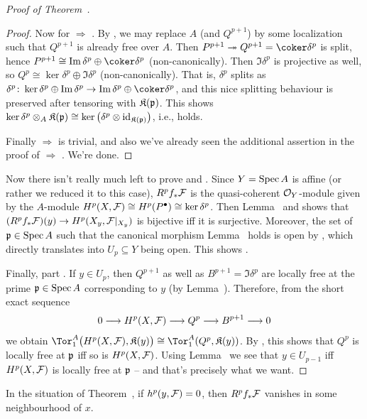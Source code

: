 \documentclass[a4paper,parskip=half,numbers=enddot, DIV=12]{scrreprt}
\begin{document}
\begin{proof}[Proof of Theorem~]
\begin{proof}
	Now for  $\Rightarrow$ . By \cite[Corollary~1.5.1]{alg2}, we may replace $A$ (and $Q^{p+1}$) by some localization such that $Q^{p+1}$ is already free over $A$. Then $P^{p+1}\epimorphism Q^{p+1}=\coker\delta^p$ is split, hence $P^{p+1}\cong \Im\delta^p\oplus \coker\delta^p$ (non-canonically). Then $\Im\delta^p$ is projective as well, so $Q^p\cong \ker\delta^p\oplus\Im\delta^p$ (non-canonically). That is, $\delta^p$ splits as $\delta^p\colon \ker\delta^p\oplus\Im\delta^p\morphism\Im\delta^p\oplus\coker\delta^p$, and this nice splitting behaviour is preserved after tensoring with $\mathfrak{K}(\mathfrak{p})$. This shows $\ker\delta^p\otimes_A\mathfrak{K}(\mathfrak{p})\cong \ker\left(\delta^p\otimes\operatorname{id}_{\mathfrak{K}(\mathfrak{p})}\right)$, i.e.,  holds.
	
	Finally  $\Rightarrow$  is trivial, and also we've already seen the additional assertion in the proof of  $\Rightarrow$ . We're done.
\end{proof}

	Now there isn't really much left to prove  and . Since $Y=\operatorname{Spec} A$ is affine (or rather we reduced it to this case), $R^pf_*\mathcal{F}$ is the quasi-coherent $\mathcal{O}_Y$-module given by the $A$-module $H^p(X,\mathcal{F})\cong H^p(P^\bullet)\cong \ker\delta^p$. Then Lemma~ and  shows that $(R^pf_*\Ff)(y)\morphism H^p(X_y,\Ff|_{X_y})$ is bijective iff it is surjective. Moreover, the set of $\mathfrak{p}\in\operatorname{Spec} A$ such that the canonical morphism Lemma~ holds is open by \cite[Corollary~1.5.1]{alg2}, which directly translates into $U_p\subseteq Y$ being open. This shows .
	
	Finally, part . If $y\in U_p$, then $Q^{p+1}$ as well as $B^{p+1}=\Im \delta^p$ are locally free at the prime $\mathfrak{p}\in\operatorname{Spec} A$ corresponding to $y$ (by Lemma~). Therefore, from the short exact sequence
	\begin{align*}
		0\morphism H^p(X,\Ff)\morphism Q^p\morphism B^{p+1}\morphism 0
	\end{align*}
	we obtain $\Tor_1^A\big(H^p(X,\Ff),\KK(y)\big)\cong \Tor_1^A(Q^p,\KK(y))$. By \cite[Proposition~1.3.1]{homalg}, this shows that $Q^p$ is locally free at $\mathfrak{p}$ iff so is $H^p(X,\mathcal{F})$. Using Lemma~ we see that $y\in U_{p-1}$ iff $H^p(X,\mathcal{F})$ is locally free at $\mathfrak{p}$ -- and that's precisely what we want.
\end{proof}
\begin{cor}
	In the situation of Theorem~, if $h^p(y,\mathcal{F})=0$, then $R^pf_*\mathcal{F}$ vanishes in some neighbourhood of $x$.
\end{cor}
\end{document}
